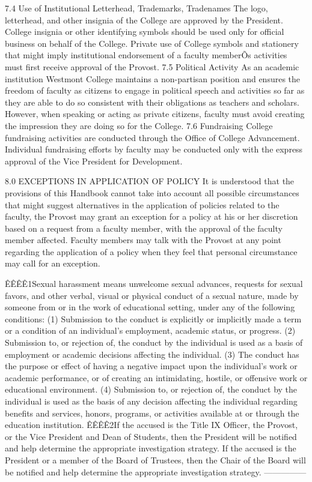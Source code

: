 \documentclass[letterpaper, 11pt]{article}
\begin{document}
7.4 Use of Institutional Letterhead, Trademarks, Tradenames
   The logo, letterhead, and other insignia of the College are approved by the President.  College insignia or other identifying symbols should be used only for official business on behalf of the College.  Private use of College symbols and stationery that might imply institutional endorsement of a faculty memberÕs activities must first receive approval of the Provost.
7.5 Political Activity
   As an academic institution Westmont College maintains a non-partisan position and ensures the freedom of faculty as citizens to engage in political speech and activities so far as they are able to do so consistent with their obligations as teachers and scholars.  However, when speaking or acting as private citizens, faculty must avoid creating the impression they are doing so for the College.
7.6 Fundraising
   College fundraising activities are conducted through the Office of College Advancement.  Individual fundraising efforts by faculty may be conducted only with the express approval of the Vice President for Development.
   
8.0 EXCEPTIONS IN APPLICATION OF POLICY
   It is understood that the provisions of this Handbook cannot take into account all possible circumstances that might suggest alternatives in the application of policies related to the faculty, the Provost may grant an exception for a policy at his or her discretion based on a request from a faculty member, with the approval of the faculty member affected.  Faculty members may talk with the Provost at any point regarding the application of a policy when they feel that personal circumstance may call for an exception.





ÊÊÊÊ1Sexual harassment means unwelcome sexual advances, requests for sexual favors, and other verbal, visual or physical conduct of a sexual nature, made by someone from or in the work of educational setting, under any of the following conditions:
(1)  Submission to the conduct is explicitly or implicitly made a term or a condition of an individual's employment, academic status, or progress.
(2)  Submission to, or rejection of, the conduct by the individual is used as a basis of employment or academic decisions affecting the individual.
(3)  The conduct has the purpose or effect of having a negative impact upon the individual's work or academic performance, or of creating an intimidating, hostile, or offensive work or educational environment.
(4)  Submission to, or rejection of, the conduct by the individual is used as the basis of any decision affecting the individual regarding benefits and services, honors, programs, or activities available at or through the education institution.
ÊÊÊÊ2If the accused is the Title IX Officer, the Provost, or the Vice President and Dean of Students, then the President will be notified and help determine the appropriate investigation strategy.  If the accused is the President or a member of the Board of Trustees, then the Chair of the Board will be notified and help determine the appropriate investigation strategy.
---------------
\end{document}
